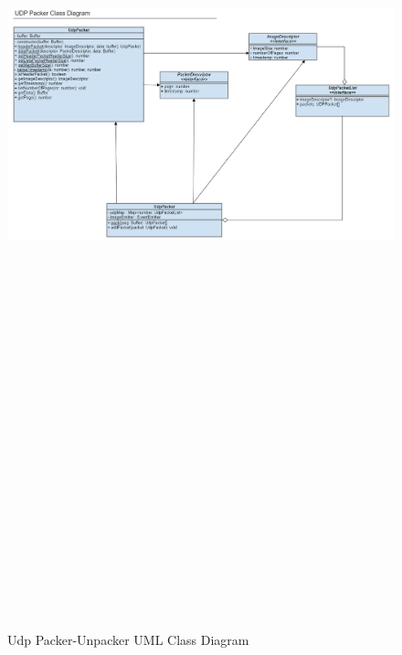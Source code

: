 \begin{figure}[ht]
    \label{fig:udp-packer-class-uml}
    \includegraphics[width=15cm, height=30cm,keepaspectratio]{img/udp-packer-uml-class.png}
    \caption{Udp Packer-Unpacker UML Class Diagram}
\end{figure}

